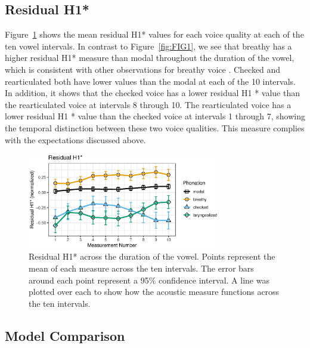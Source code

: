 \subsection{Residual H1*} \label{sec:ResidH1}

Figure~\ref{fig:FIG2} shows the mean residual H1* values for each voice quality at each of the ten vowel intervals. In contrast to Figure~\ref{fig:FIG1}, we see that breathy has a higher residual H1* measure than modal throughout the duration of the vowel, which is consistent with other observations for breathy voice \citep{fischer-jorgensenPhoneticAnalysisBreathy1968}. Checked and rearticulated both have lower values than the modal at each of the 10 intervals. In addition, it shows that the checked voice has a lower residual H1 * value than the rearticulated voice at intervals 8 through 10. The rearticulated voice has a lower residual H1 * value than the checked voice at intervals 1 through 7, showing the temporal distinction between these two voice qualities. This measure complies with the expectations discussed above. 

\begin{figure}[htbp]
  \centering
  \includegraphics[width = 0.75\textwidth]{images/Figure2.eps}
  \caption{\label{fig:FIG2}{Residual H1* across the duration of the vowel. Points represent the mean of each measure across the ten intervals. The error bars around each point represent a 95\% confidence interval. A line was plotted over each to show how the acoustic measure functions across the ten intervals.}}
\end{figure}


\subsection{Model Comparison} \label{sec:Comparison}

